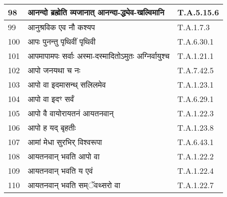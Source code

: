 \documentclass[17pt]{extarticle}
\begin{document}
\begin{longtable}{||p{0.4in}||p{4.9in}||p{0.9in}||}
    \hline
        
    98 & आनन्दो ब्रह्मेति व्यजानात् आनन्दा{-}द्ध्येव{-}खल्विमानि & T.A.5.15.6       \\
    
    \hline
        
    99 & आनुश्रविक एव नौ कश्यप & T.A.1.7.3       \\
    
    \hline
        
    100 & आपः पुनन्तु पृथिवीं पृथिवी & T.A.6.30.1       \\
    
    \hline
        
    101 & आपमापामपः सर्वाः अस्मा{-}दस्मादितोऽमुतः अग्निर्वायुश्च & T.A.1.21.1       \\
    
    \hline
        
    102 & आपो जनयथा च नः & T.A.7.42.5       \\
    
    \hline
        
    103 & आपो वा इदमासन्थ् सलिलमेव & T.A.1.23.1       \\
    
    \hline
        
    104 & आपो वा इदꣳ सर्वं & T.A.6.29.1       \\
    
    \hline
        
    105 & आपो वै वायोरायतनं आयतनवान् & T.A.1.22.3       \\
    
    \hline
        
    106 & आपो ह यद् बृहतीः & T.A.1.23.8       \\
    
    \hline
        
    107 & आमां मेधा सुरभिर् विश्वरूपा & T.A.6.43.1       \\
    
    \hline
        
    108 & आयतनवान् भवति आपो वा & T.A.1.22.2       \\
    
    \hline
        
    109 & आयतनवान् भवति य एवं & T.A.1.22.4       \\
    
    \hline
        
    110 & आयतनवान् भवति सम्ॅवथ्सरो वा & T.A.1.22.7       \\
    

\end{longtable}
\end{document}
